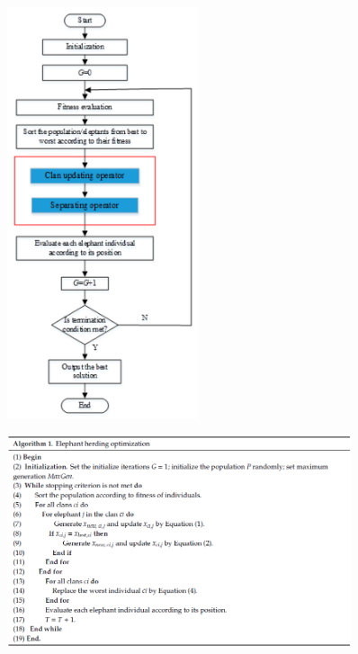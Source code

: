 \begin{figure}[ht]
    \begin{center}
        \includegraphics[width=0.5\textwidth]{assets/img/eho_flowchart.png}
        \caption[EHO Flowchart]{\cite[Li et al, S.4]{li_lei_alavi_wang_2020}}
        \label{eho_flowchart}
    \end{center}
\end{figure}

\begin{figure}[ht]
    \begin{center}
        \includegraphics[width=0.9\textwidth]{assets/img/eho_pseudocode.PNG}
        \caption[EHO Pseudocode]{\cite[Li et al, S.5]{li_lei_alavi_wang_2020}}
        \label{eho_pseudocode}
    \end{center}
\end{figure}